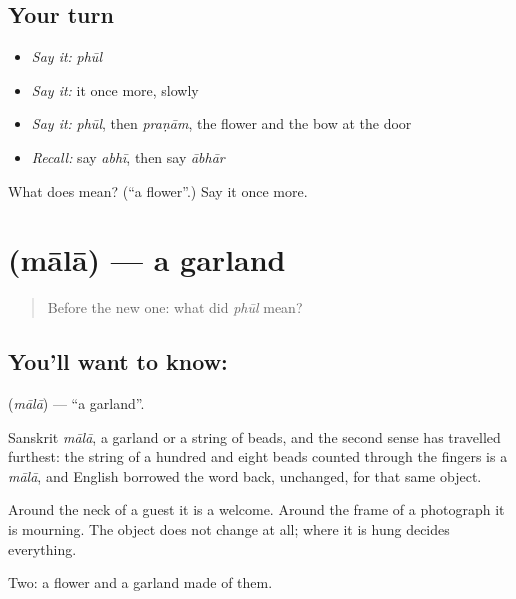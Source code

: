 \subsection*{Your turn}
\begin{itemize}
\raggedright
  \item \emph{Say it:} \emph{phūl}
  \item \emph{Say it:} it once more, slowly
  \item \emph{Say it:} \emph{phūl}, then \emph{praṇām}, the flower and the bow at the door
  \item \emph{Recall:} say \emph{abhī}, then say \emph{ābhār}
\end{itemize}

\begin{tcolorbox}[breakable,colback=teal!4,colframe=teal!35!black,title={Before you move on}]
What does  mean? (\textquotedblleft{}a flower\textquotedblright{}.) Say it once more.
\end{tcolorbox}
\section[\texorpdfstring{\hi{माला} (mālā)}{माला (mālā)}]{ (mālā) — a garland}

\label{lesson:HI-C51-garland}



\begin{quote}
Before the new one: what did \emph{phūl} mean?
\end{quote}

\subsection*{You'll want to know: }
\textbf{} (\emph{mālā}) — \textquotedblleft{}a garland\textquotedblright{}.

Sanskrit \emph{mālā}, a garland or a string of beads, and the second sense has travelled furthest: the string of a hundred and eight beads counted through the fingers is a \emph{mālā}, and English borrowed the word back, unchanged, for that same object.

Around the neck of a guest it is a welcome. Around the frame of a photograph it is mourning. The object does not change at all; where it is hung decides everything.

\begin{grammarlens}[title={What you've built}]
Two: a flower and a garland made of them.
\end{grammarlens}

